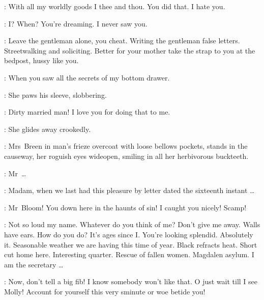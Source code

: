 \Gerty:
With all my worldly goods I thee and thou.
 You did that.
I hate you.

\Bloom:
I? When?
You're dreaming.
I never saw you.

\Bawd:
Leave the gentleman alone,
you cheat.
Writing the gentleman false letters.
Streetwalking and soliciting.
Better for your mother
take the strap to you at the bedpost,
hussy like you.

\Gerty:
When you saw all the secrets of my bottom drawer.

:
She paws his sleeve,
slobbering.

\Gerty:
Dirty married man!
I love you for doing that to me.

:
She glides away crookedly.

:
Mrs~Breen in man's frieze overcoat with loose bellows pockets,
stands in the causeway,
her roguish eyes wideopen,
smiling in all her herbivorous buckteeth.

\MrsBreen:
Mr~\ldots
{}

\Bloom:
Madam,
when we last had this pleasure by letter dated the sixteenth instant \ldots

\MrsBreen:
Mr~Bloom!
You down here in the haunts of sin!
I caught you nicely!
Scamp!

\Bloom:
Not so loud my name.
Whatever do you think of me?
Don't give me away.
Walls have ears.
How do you do? It's ages since I.
You're looking splendid.
Absolutely it.
Seasonable weather we are having this time of year.
Black refracts heat.
Short cut home here.
Interesting quarter.
Rescue of fallen women.
Magdalen asylum.
I am the secretary \ldots

\MrsBreen:
Now,
don't tell a big fib!
I know somebody won't like that.
O just wait till I see Molly!
Account for yourself this very sminute or woe betide you!

